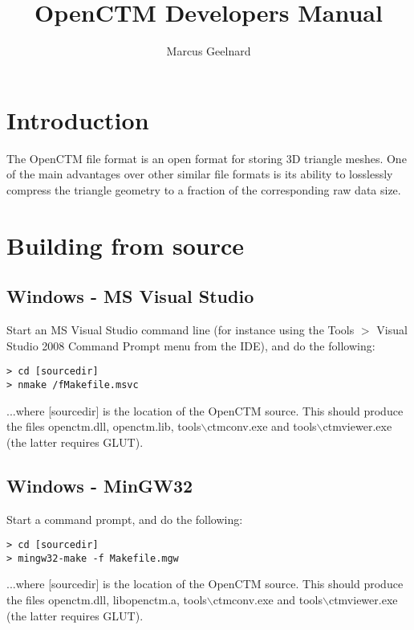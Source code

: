 

\author{Marcus Geelnard}
\title{OpenCTM Developers Manual}



\maketitle

\tableofcontents

\chapter{Introduction}
The OpenCTM file format is an open format for storing 3D triangle meshes.
One of the main advantages over other similar file formats is its ability
to losslessly compress the triangle geometry to a fraction of the corresponding
raw data size.

\chapter{Building from source}

\section{Windows - MS Visual Studio}
Start an MS Visual Studio command line (for instance using the Tools $>$
Visual Studio 2008 Command Prompt menu from the IDE), and do the following:

\begin{lstlisting}
> cd [sourcedir]
> nmake /fMakefile.msvc
\end{lstlisting}

...where [sourcedir] is the location of the OpenCTM source. This should produce the
files openctm.dll, openctm.lib, tools$\backslash$ctmconv.exe and
tools$\backslash$ctmviewer.exe (the latter requires GLUT).


\section{Windows - MinGW32}
Start a command prompt, and do the following:

\begin{lstlisting}
> cd [sourcedir]
> mingw32-make -f Makefile.mgw
\end{lstlisting}

...where [sourcedir] is the location of the OpenCTM source. This should produce the
files openctm.dll, libopenctm.a, tools$\backslash$ctmconv.exe and
tools$\backslash$ctmviewer.exe (the latter requires GLUT).


